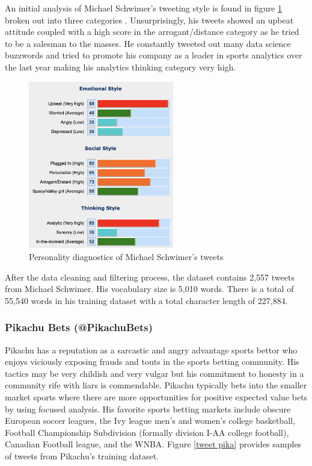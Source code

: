 \documentclass[5p,authoryear]{elsarticle}
\begin{document}
An initial analysis of Michael Schwimer’s tweeting style is found in figure \ref{swim_personality} broken out into three categories \citep{Anal_words}. Unsurprisingly, his tweets showed an upbeat attitude coupled with a high score in the arrogant/distance category as he tried to be a salesman to the masses. He constantly tweeted out many data science buzzwords and tried to promote his company as a leader in sports analytics over the last year making his analytics thinking category very high.

\begin{figure}[!htb] \centering
	\includegraphics[width=2.5in]{figures/personality_Swim.png}
	\caption[]{Personality diagnostics of Michael Schwimer’s tweets} 
	\label{swim_personality} 
\end{figure}

After the data cleaning and filtering process, the dataset contains 2,557 tweets from Michael Schwimer. His vocabulary size is 5,010 words. There is a total of 55,540 words in his training dataset with a total character length of 227,884. 

\subsubsection{Pikachu Bets (@PikachuBets)}\label{pika}

Pikachu has a reputation as a sarcastic and angry advantage sports bettor who enjoys viciously exposing frauds and touts in the sports betting community. His tactics may be very childish and very vulgar but his commitment to honesty in a community rife with liars is commendable. Pikachu typically bets into the smaller market sports where there are more opportunities for positive expected value bets by using focused analysis. His favorite sports betting markets include obscure European soccer leagues, the Ivy league men’s and women’s college basketball, Football Championship Subdivision (formally division I-AA college football), Canadian Football league, and the WNBA. Figure \ref{tweet pika} provides samples of tweets from Pikachu’s training dataset.
\end{document}
